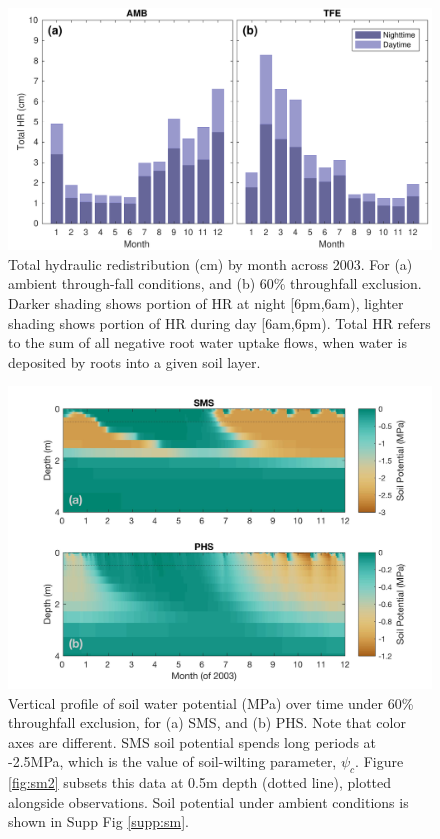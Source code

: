 \documentclass[draft,linenumbers]{agujournal}
\begin{document}
    \clearpage
    \begin{figure}[h]
     \centering
     \includegraphics[width=30pc]{../figs3/hr.pdf}
     \caption{Total hydraulic redistribution (cm) by month across 2003. For (a) ambient through-fall conditions, and (b) 60\% throughfall exclusion. 
     Darker shading shows portion of HR at night [6pm,6am), lighter shading shows portion of HR during day [6am,6pm).
     Total HR refers to the sum of all negative root water uptake flows, when water is deposited by roots into a given soil layer.}
     \label{fig:hr}
  \end{figure}

  
      \clearpage
    \begin{figure}[h]
     \centering
     \includegraphics[width=30pc]{../figs3/smp.jpg}
     \caption{Vertical profile of soil water potential (MPa) over time under 60\% throughfall exclusion, for
     (a) SMS, and 
     (b) PHS.
     Note that color axes are different.
     SMS soil potential spends long periods at -2.5MPa, which is the value of soil-wilting parameter, $\psi_c$.
     Figure \ref{fig:sm2} subsets this data at 0.5m depth (dotted line), plotted alongside observations.
     Soil potential under ambient conditions is shown in Supp Fig \ref{supp:sm}.
 }
     \label{fig:sm}
  \end{figure}
  
\end{document}

